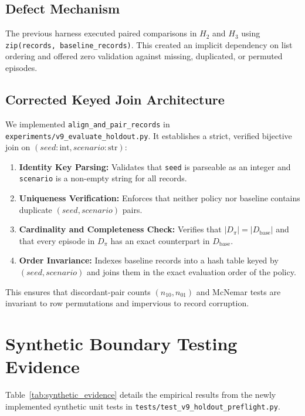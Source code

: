 \documentclass[10pt,a4paper]{article}
\begin{document}
\subsection{Defect Mechanism}
The previous harness executed paired comparisons in $H_2$ and $H_3$ using \texttt{zip(records, baseline\_records)}. This created an implicit dependency on list ordering and offered zero validation against missing, duplicated, or permuted episodes.

\subsection{Corrected Keyed Join Architecture}
We implemented \texttt{align\_and\_pair\_records} in \texttt{experiments/v9\_evaluate\_holdout.py}. It establishes a strict, verified bijective join on $(seed: \text{int}, scenario: \text{str})$:
\begin{enumerate}
    \item \textbf{Identity Key Parsing:} Validates that \texttt{seed} is parseable as an integer and \texttt{scenario} is a non-empty string for all records.
    \item \textbf{Uniqueness Verification:} Enforces that neither policy nor baseline contains duplicate $(seed, scenario)$ pairs.
    \item \textbf{Cardinality and Completeness Check:} Verifies that $|D_{\pi}| = |D_{\mathrm{base}}|$ and that every episode in $D_{\pi}$ has an exact counterpart in $D_{\mathrm{base}}$.
    \item \textbf{Order Invariance:} Indexes baseline records into a hash table keyed by $(seed, scenario)$ and joins them in the exact evaluation order of the policy.
\end{enumerate}
This ensures that discordant-pair counts $(n_{10}, n_{01})$ and McNemar tests are invariant to row permutations and impervious to record corruption.

\section{Synthetic Boundary Testing Evidence}
Table~\ref{tab:synthetic_evidence} details the empirical results from the newly implemented synthetic unit tests in \texttt{tests/test\_v9\_holdout\_preflight.py}.
\end{document}
